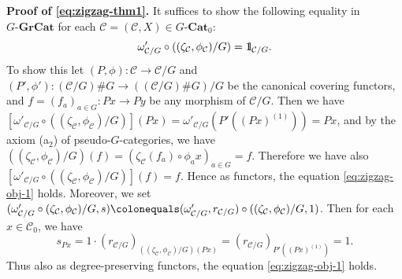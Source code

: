 \documentclass{surv-l}
\numberwithin{equation}{chapter}
\numberwithin{figure}{chapter}
\theoremstyle{plain}
\theoremstyle{definition}
\theoremstyle{remark}
\newcommand{\id}{1\kern-.25em{\text{{\rm l}}}}
\newcommand{\GCat}{G\text{-}\mathbf{Cat}}
\newcommand{\GGrCat}{G\text{-}\mathbf{GrCat}}
\begin{document}
{\bf Proof of \eqref{eq:zigzag-thm1}.}
It suffices to show the following equality in $\GGrCat$
for each ${\mathcal{C}} = ({\mathcal{C}}, X) \in \GCat_0$:
\begin{equation}\label{eq:zigzag-obj-1}
\omega'_{{\mathcal{C}}/G} \circ ((\zeta_{\mathcal{C}}, \phi_{\mathcal{C}})/G) = \id_{{\mathcal{C}}/G}.
\end{equation}
To show this let $(P, \phi) \colon {\mathcal{C}} \to {\mathcal{C}}/G$ and
$(P', \phi') \colon ({\mathcal{C}}/G)\# G \to (({\mathcal{C}}/G)\# G)/G$ be the
canonical covering functors, and
$f = (f_a)_{a\in G} \colon Px \to Py$ be any morphism of ${\mathcal{C}}/G$.
Then we have
$[\omega'_{{\mathcal{C}}/G} \circ ((\zeta_{\mathcal{C}}, \phi_{\mathcal{C}})/G)](Px)
= \omega'_{{\mathcal{C}}/G}(P'((Px)^{(1)})) = Px$,
and by the axiom (a$_2$) of pseudo-$G$-categories,
we have
$((\zeta_{\mathcal{C}}, \phi_{\mathcal{C}})/G)(f) = (\zeta_{\mathcal{C}}(f_a) \circ \phi_ax)_{a \in G} = f$.
Therefore we have also
$[\omega'_{{\mathcal{C}}/G} \circ ((\zeta_{\mathcal{C}}, \phi_{\mathcal{C}})/G)](f) = f$.
Hence as functors, the equation \eqref{eq:zigzag-obj-1} holds.
Moreover, we set
$(\omega'_{{\mathcal{C}}/G} \circ (\zeta_{\mathcal{C}}, \phi_{\mathcal{C}})/G, s)\colonequals 
(\omega'_{{\mathcal{C}}/G}, r_{{\mathcal{C}}/G})\circ ((\zeta_{\mathcal{C}}, \phi_{\mathcal{C}})/G, 1)$.
Then for each $x \in {\mathcal{C}}_0$, we have
\[
s_{Px} = 1\cdot (r_{{\mathcal{C}}/G})_{((\zeta_{\mathcal{C}}, \phi_{\mathcal{C}})/G)(Px)} =
(r_{{\mathcal{C}}/G})_{P'((Px)^{(1)})} = 1.
\]
Thus also as degree-preserving functors, the equation \eqref{eq:zigzag-obj-1} holds.
\end{document}

